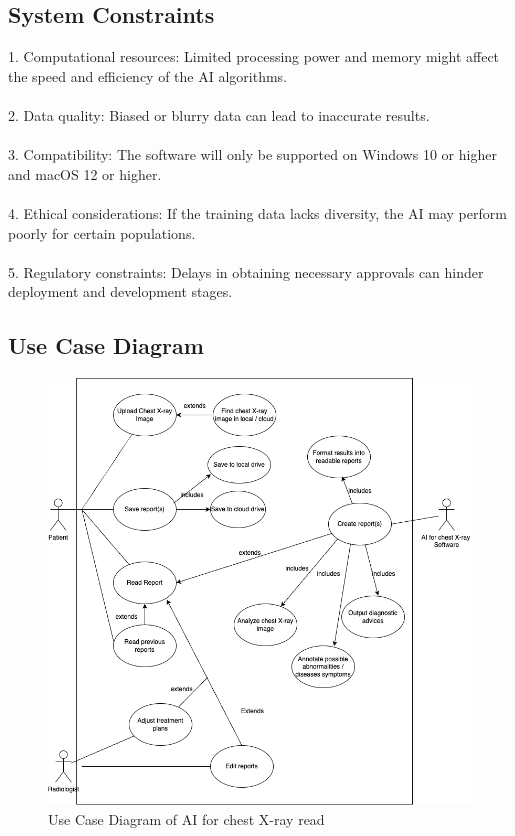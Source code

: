 \documentclass[12pt]{article}
\begin{document}
\subsection{System Constraints}

1. Computational resources: Limited processing power and memory might affect the speed and efficiency of the AI algorithms.\\
\\
2. Data quality: Biased or blurry data can lead to inaccurate results.\\
\\
3. Compatibility: The software will only be supported on Windows 10 or higher and macOS 12 or higher. \\
\\
4. Ethical considerations: If the training data lacks diversity, the AI may perform poorly for certain populations. \\
\\
5. Regulatory constraints: Delays in obtaining necessary approvals can hinder deployment and development stages.\\

\subsection{Use Case Diagram}
\begin{figure}
    \centering
    \includegraphics[width=1\linewidth]{UseCase.png}
    \caption{Use Case Diagram of AI for chest X-ray read}
    \label{fig:enter-label}
\end{figure}
\end{document}
